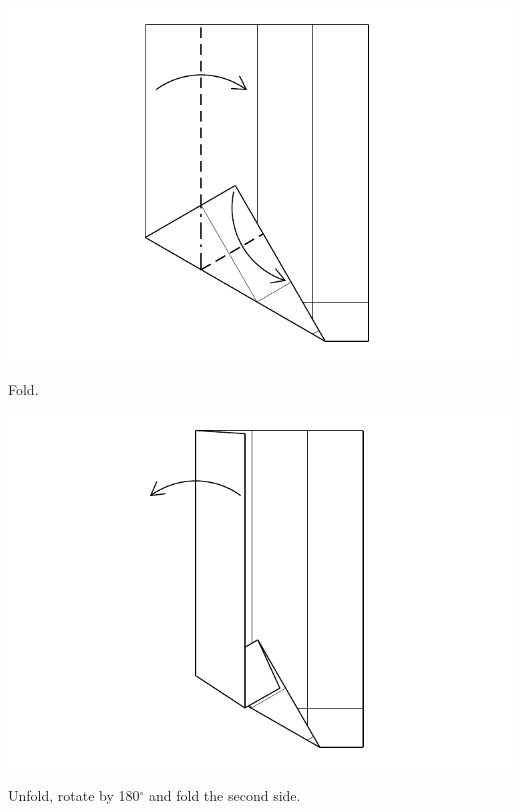 \documentclass[11pt]{article}
\begin{document}
\vspace*{0.5in}

\begin{minipage}[t]{0.45\textwidth}
  \includegraphics[width=\textwidth]{../figs/fig06-06}
  \begin{itemize}{\item[6.] Fold.}\end{itemize}
\end{minipage}
\hfill
\begin{minipage}[t]{0.45\textwidth}
  \includegraphics[width=\textwidth]{../figs/fig06-07}
  \begin{itemize}{\item[7.] Unfold, rotate by 180$^\circ$ and fold the second side.}\end{itemize}
\end{minipage}
\end{document}
